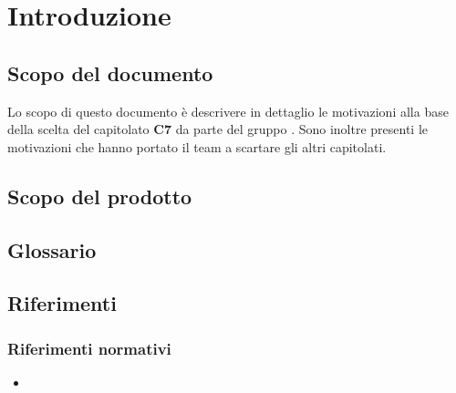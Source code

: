 \section{Introduzione}

\subsection{Scopo del documento}
Lo scopo di questo documento è descrivere in dettaglio le motivazioni alla base della scelta del capitolato \textbf{C7} da parte del gruppo \GroupName{}.
Sono inoltre presenti le motivazioni che hanno portato il team a scartare gli altri capitolati.

\subsection{Scopo del prodotto}
\ScopoProdotto{}

\subsection{Glossario}
\DescrizioneGlossario{}

\subsection{Riferimenti}
\subsubsection{Riferimenti normativi}
\begin{itemize}
\item \vNormeDiProgetto
\end{itemize}

